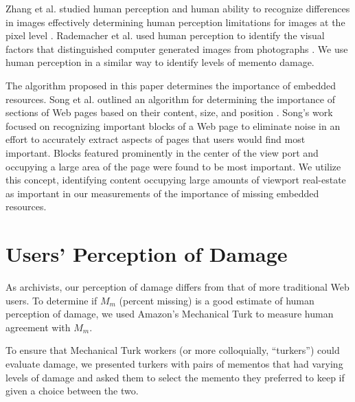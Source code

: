 Zhang et al. studied human perception and human ability to recognize differences in images effectively determining human perception limitations for images at the pixel level \cite{Zhang200830}. Rademacher et al. used human perception to identify the visual factors that distinguished computer generated images from photographs \cite{rademacher}. We use human perception in a similar way to identify levels of memento damage.

The algorithm proposed in this paper determines the importance of embedded resources. Song et al. outlined an algorithm for determining the importance of sections of Web pages based on their content, size, and position \cite{blockImportance}. Song's work focused on recognizing important blocks of a Web page to eliminate noise in an effort to accurately extract aspects of pages that users would find most important. Blocks featured prominently in the center of the view port and occupying a large area of the page were found to be most important. We utilize this concept, identifying content occupying large amounts of viewport real-estate as important in our measurements of the importance of missing embedded resources.



\section{Users' Perception of Damage}
\label{turk} 


As archivists, our perception of damage differs from that of more traditional Web users. To determine if $M_m$ (percent missing) is a good estimate of human perception of damage, we used Amazon's Mechanical Turk to measure human agreement with $M_m$.

To ensure that Mechanical Turk workers (or more colloquially, ``turkers'') could evaluate damage, we presented turkers with pairs of mementos that had varying levels of damage and asked them to select the memento they preferred to keep if given a choice between the two.

